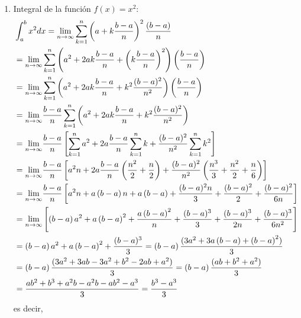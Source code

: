 \begin{enumerate}[leftmargin=1.2em,   itemindent=0pt,       labelwidth=\labelwidth,labelsep=0.5em,]
\item { \textnormal{Integral de la función}} $f(x)=x^2$:
{\footnotesize
\begin{align*}
&\int_{a}^{b}x^{2}dx=\lim_{n\to \infty}\sum_{k=1}^{n}\left( a+k\frac{b-a}{n}%
\right) ^{2}\frac{\left( b-a\right) }{n} \\
&=\underset{n\rightarrow \infty }{\lim }\sum\limits_{k=1}^{n}\left(
a^{2}+2ak\frac{b-a}{n}+\left( k\frac{b-a}{n}\right) ^{2}\right) \left( \frac{%
b-a}{n}\right) \\
&=\underset{n\rightarrow \infty }{\lim }\sum\limits_{k=1}^{n}\left(
a^{2}+2ak\frac{b-a}{n}+k^{2}\frac{(b-a)^{2}}{n^{2}}\right) \left( \frac{b-a}{%
n}\right) \\
&=\underset{n\rightarrow \infty }{\lim }\frac{b-a}{n}\sum\limits_{k=1}^{n}%
\left( a^{2}+2ak\frac{b-a}{n}+k^{2}\frac{(b-a)^{2}}{n^{2}}\right) \\
&=\underset{n\rightarrow \infty }{\lim }\frac{b-a}{n}\left[
\sum\limits_{k=1}^{n}a^{2}+2a\frac{b-a}{n}\sum\limits_{k=1}^{n}k+\frac{%
(b-a)^{2}}{n^{2}}\sum\limits_{k=1}^{n}k^{2}\right] \\
&=\underset{n\rightarrow \infty }{\lim }\frac{b-a}{n}\left[ a^{2}n+2a\frac{%
b-a}{n}\left( \frac{n^{2}}{2}+\frac{n}{2}\right) +\frac{(b-a)^{2}}{n^{2}}%
\left( \frac{n^{3}}{3}+\frac{n^{2}}{2}+\frac{n}{6}\right) \right]\\
&=\underset{n\rightarrow \infty }{\lim }\frac{b-a}{n}\left[
a^{2}n+a\left(
b-a\right) n+a\left( b-a\right) +\frac{(b-a)^{2}n}{3}+\frac{(b-a)^{2}}{2}+\frac{(b-a)^{2}}{6n}\right] \\
%
&=\underset{n\rightarrow \infty }{\lim }\left[ \left( b-a\right)
a^{2}+a\left( b-a\right) ^{2}+\frac{a\left( b-a\right) ^{2}}{n}+\frac{%
(b-a)^{3}}{3}+\frac{(b-a)^{3}}{2n}+\frac{(b-a)^{3}}{6n^{2}}\right] \\
%
&=\left( b-a\right) a^{2}+a\left( b-a\right) ^{2}+\frac{(b-a)^{3}}{3} %
=\left( b-a\right) \frac{(3a^{2}+3a\left( b-a\right) +\left( b-a\right)^{2})}{3} \\
&=\left( b-a\right) \frac{(3a^{2}+3ab-3a^{2}+b^{2}-2ab+a^{2})}{3} %
=\left( b-a\right) \frac{(ab+b^{2}+a^{2})}{3} \\
&=\frac{ab^{2}+b^{3}+a^{2}b-a^{2}b-ab^{2}-a^{3}}{3}=\frac{b^{3}-a^{3}}{3}
\end{align*}
}
es decir,


\end{enumerate}
